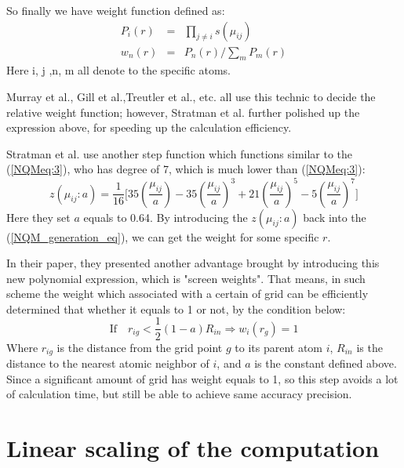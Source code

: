 So finally we have weight function defined as:
\begin{eqnarray}\label{NQM_generation_eq}
  P_{i}(r) &=&  \prod_{j \neq i}s(\mu_{ij}) \nonumber \\
  w_{n}(r) &=& P_{n}(r)/\sum_{m} P_{m}(r)
\end{eqnarray}
Here i, j ,n, m all denote to the specific atoms.

Murray et al.\cite{MHL}, Gill et al.\cite{PJM},Treutler et
al.\cite{OR}, etc. all use this technic to decide the relative
weight function; however, Stratman et al.\cite{EGM} further polished
up the expression above, for speeding up the calculation efficiency.

Stratman et al. use another step function which functions similar to
the (\ref{NQMeq:3}), who has degree of 7, which is much lower than
(\ref{NQMeq:3}):
\begin{equation}\label{NQMeq:4}
z(\mu_{ij}:a) = \frac{1}{16} \Big[ 35(\frac{\mu_{ij}}{a}) - 35 (
\frac{\mu_{ij}}{a})^{3} + 21(\frac{\mu_{ij}}{a})^{5}
-5(\frac{\mu_{ij}}{a})^{7} \Big]
\end{equation}
Here they set $a$ equals to 0.64. By introducing the $z(\mu_{ij}:a)$
back into the (\ref{NQM_generation_eq}), we can get the weight for
some specific $r$.

In their paper\cite{EGM}, they presented another advantage brought
by introducing this new polynomial expression, which is "screen
weights". That means, in such scheme the weight which associated
with a certain of grid can be efficiently determined that whether it
equals to 1 or not, by the condition below:
\begin{equation}\label{}
\text{If} \quad r_{ig} < \frac{1}{2}(1-a)R_{in} \Rightarrow
w_{i}(r_{g}) = 1
\end{equation}
Where $r_{ig}$ is the distance from the grid point $g$ to its parent
atom $i$, $R_{in}$ is the distance to the nearest atomic neighbor of
$i$, and $a$ is the constant defined above. Since a significant
amount of grid has weight equals to 1, so this step avoids a lot of
calculation time, but still be able to achieve same accuracy
precision\cite{EGM}.


\section{Linear scaling of the computation}
%
%
%
%
%

